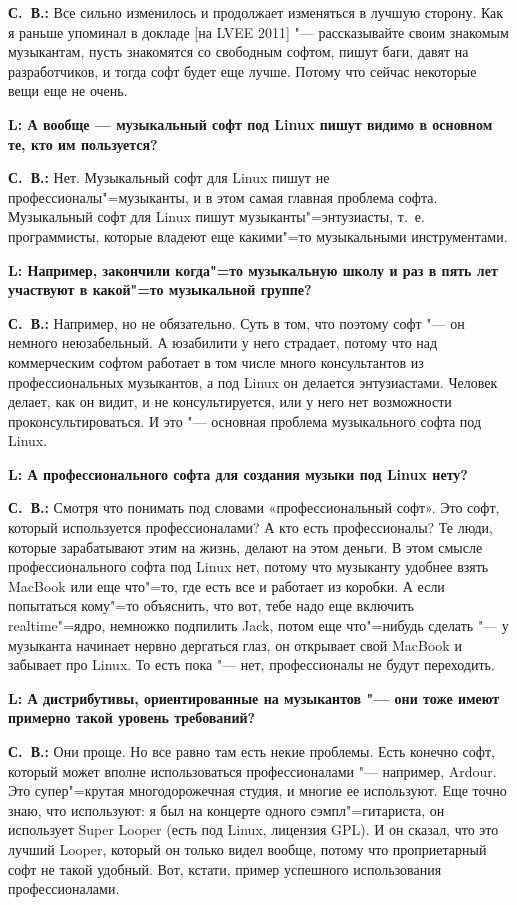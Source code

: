 \documentclass[10pt, a5paper]{article}
\begin{document}
{\noindent \bf С.~В.:} Все сильно изменилось и продолжает изменяться в лучшую сторону. Как я раньше упоминал в докладе [на LVEE 2011] "--- рассказывайте своим знакомым музыкантам, пусть знакомятся со свободным софтом, пишут баги, давят на разработчиков, и тогда софт будет еще лучше. Потому что сейчас некоторые вещи еще не очень.

{\noindent \bf L: А вообще — музыкальный софт под Linux пишут видимо в основном те, кто им пользуется?}

{\noindent \bf С.~В.:} Нет. Музыкальный софт для Linux пишут не профессионалы"=музыканты, и в этом самая главная проблема софта. Музыкальный софт для Linux пишут музыканты"=энтузиасты, т.~е. программисты, которые владеют еще какими"=то музыкальными инструментами.

{\noindent \bf L: Например, закончили когда"=то музыкальную школу и раз в пять лет участвуют в какой"=то музыкальной группе?}

{\noindent \bf С.~В.:} Например, но не обязательно. Суть в том, что поэтому софт "--- он немного неюзабельный. А юзабилити у него страдает, потому что над коммерческим софтом работает в том числе много консультантов из профессиональных музыкантов, а под Linux он делается энтузиастами. Человек делает, как он видит, и не консультируется, или у него нет возможности проконсультироваться. И это "--- основная проблема музыкального софта под Linux.

{\noindent \bf L: А профессионального софта для создания музыки под Linux нету?}

{\noindent \bf С.~В.:} Смотря что понимать под словами «профессиональный софт». Это софт, который используется профессионалами? А кто есть профессионалы? Те люди, которые зарабатывают этим на жизнь, делают на этом деньги. В этом смысле профессионального софта под Linux нет, потому что музыканту удобнее взять MacBook или еще что"=то, где есть все и работает из коробки. А если попытаться кому"=то объяснить, что вот, тебе надо еще включить realtime"=ядро, немножко подпилить Jack, потом еще что"=нибудь сделать "--- у музыканта начинает нервно дергаться глаз, он открывает свой MacBook и забывает про Linux. То есть пока "--- нет, профессионалы не будут переходить. 

{\noindent \bf L: А дистрибутивы, ориентированные на музыкантов "--- они тоже имеют примерно такой уровень требований?}

{\noindent \bf С.~В.:} Они проще. Но все равно там есть некие проблемы. Есть конечно софт, который может вполне использоваться профессионалами "--- например, Ardour. Это супер"=крутая многодорожечная студия, и многие ее используют. Еще точно знаю, что используют: я был на концерте одного сэмпл"=гитариста, он использует Super Looper (есть под Linux, лицензия GPL). И он сказал, что это лучший Looper, который он только  видел вообще, потому что проприетарный софт не такой удобный. Вот, кстати, пример успешного использования профессионалами.
\end{document}
